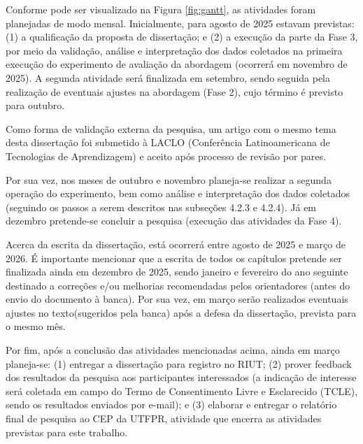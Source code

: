 Conforme pode ser visualizado na Figura \ref{fig:gantt}, as atividades foram planejadas de modo mensal. Inicialmente, para agosto de 2025 estavam previstas: (1) a qualificação da proposta de dissertação; e (2) a execução da parte da Fase 3, por meio da validação, análise e interpretação dos dados coletados na primeira execução do experimento de avaliação da abordagem (ocorrerá em novembro de 2025). A segunda atividade será finalizada em setembro, sendo seguida pela realização de eventuais ajustes na abordagem (Fase 2), cujo término é previsto para outubro.

Como forma de validação externa da pesquisa, um artigo com o mesmo tema desta dissertação foi submetido à LACLO (Conferência Latinoamericana de Tecnologias de Aprendizagem) e aceito após processo de revisão por pares. 

Por sua vez, nos meses de outubro e novembro planeja-se realizar a segunda operação do experimento, bem como análise e interpretação dos dados coletados (seguindo os passos a serem descritos nas subseções 4.2.3 e 4.2.4). Já em dezembro pretende-se concluir a pesquisa (execução das atividades da Fase 4).

 


Acerca da escrita da dissertação, está ocorrerá entre agosto de 2025 e março de 2026. É importante mencionar que a escrita de todos os capítulos pretende ser finalizada ainda em dezembro de 2025, sendo janeiro e fevereiro do ano seguinte destinado a correções e/ou melhorias recomendadas pelos orientadores (antes do envio do documento à banca). Por sua vez, em março serão realizados eventuais ajustes no texto(sugeridos pela banca) após a defesa da dissertação, prevista para o mesmo mês. 

Por fim, após a conclusão das atividades mencionadas acima, ainda em março planeja-se: (1) entregar a dissertação para registro no RIUT; (2) prover feedback dos resultados da pesquisa aos participantes interessados (a indicação de interesse será coletada em campo do Termo de Consentimento Livre e Esclarecido (TCLE), sendo os resultados enviados por e-mail); e (3) elaborar e entregar o relatório final de pesquisa ao CEP da UTFPR, atividade que encerra as atividades previstas para este trabalho. 

